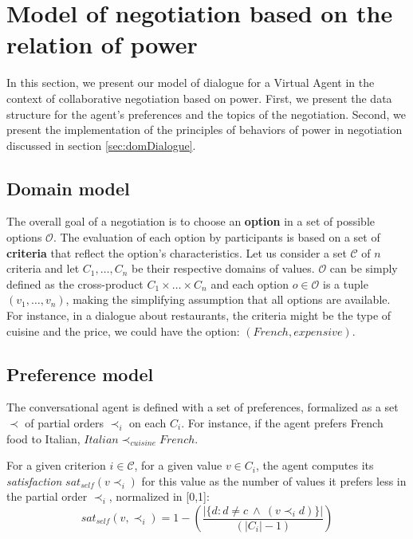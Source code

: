 \documentclass{llncs}
\begin{document}
		
		\section{Model of negotiation based on the relation of power}
		In this section, we present our model of dialogue for a Virtual Agent  in the context of collaborative negotiation based on power.	
		First, we present the data structure for the agent's preferences and the topics of the negotiation. Second, we present the implementation of the principles of behaviors of power in negotiation discussed in section \ref{sec:domDialogue}.
		\vspace{-1em} 
		\subsection{Domain model}
		The overall goal of a negotiation is to choose an \textbf{option} in a set of possible options $\mathcal{O}$. The evaluation of each option by participants is based on a set of \textbf{criteria} that reflect the option's characteristics. Let us consider a set $\mathcal{C}$ of $n$ criteria and let $C_1,\ldots,C_n$ be their respective domains of values. $\mathcal{O}$ can be simply defined as the cross-product $C_1\times\ldots\times C_n$ and each option $o\in\mathcal{O}$ is a tuple $(v_1,\ldots,v_n)$, making the simplifying assumption that all options are available. For instance, in a dialogue about restaurants, the criteria might be the type of cuisine and the price, we could have the option: $(French,expensive)$.
		
		\subsection{Preference model} 
		The conversational agent is defined with a set of preferences, formalized as a set $\prec$ of partial orders $\prec_i$ on each $C_i$. For instance, if the agent prefers French food to Italian, $Italian\prec_{cuisine}French$.
		
		For a given criterion $i\in \mathcal{C}$, for a given value $v\in C_i$, the agent computes its \emph{satisfaction} $sat_{self}(v \prec_i)$ for this value as the number of values it prefers less in the partial order $\prec_i$, normalized in [0,1]:
		\vspace{-.5em} 
		\begin{equation}
		sat_{self}(v, \prec_i) =	1 - \left( \frac{|\{d : d \neq c \  \wedge \ (v \prec_i d)\}| }{( |C_i| - 1 )}\right)
		\end{equation}
		
\end{document}
